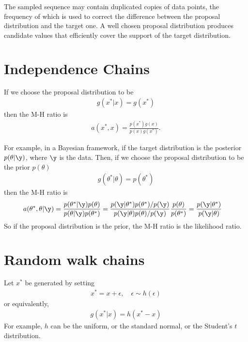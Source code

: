The sampled sequence may contain duplicated copies of data points, the frequency of which is used to correct the difference between the proposal distribution and the target one. A well chosen proposal distribution produces candidate values that efficiently cover the support of the target distribution.

\section{Independence Chains}
If we choose the proposal distribution to be
\begin{align}
g(x^*|x) = g(x^*)
\end{align}
then the M-H ratio is
\begin{align}
a(x^*, x) = \frac{p(x^*)g(x)}{p(x)g(x^*)}.
\end{align}

For example, in a Bayesian framework, if the target distribution is the posterior $p(\theta|\y)$, where $\y$ is the data. Then, if we choose the proposal distribution to be the prior $p(\theta)$
\begin{align}
g(\theta^*|\theta) = p(\theta^*)
\end{align}
then the M-H ratio is
\begin{align}
a(\theta^*, \theta | \y) &= \frac{p(\theta^*|\y)p(\theta)}{p(\theta|\y)p(\theta^*)} = \frac{p(\y|\theta^*)p(\theta^*)/p(\y)}{p(\y|\theta)p(\theta)/p(\y)}\frac{p(\theta)}{p(\theta^*)} = \frac{p(\y|\theta^*)}{p(\y|\theta)}
\end{align}
So if the proposal distribution is the prior, the M-H ratio is the likelihood ratio.

\section{Random walk chains}
Let $x^*$ be generated by setting
\begin{align}
x^* = x + \epsilon,\quad \epsilon \sim h(\epsilon)
\end{align}
or equivalently,
\begin{align}
g(x^*|x) = h(x^* - x)
\end{align}
For example, $h$ can be the uniform, or the standard normal, or the Student's $t$ distribution.


